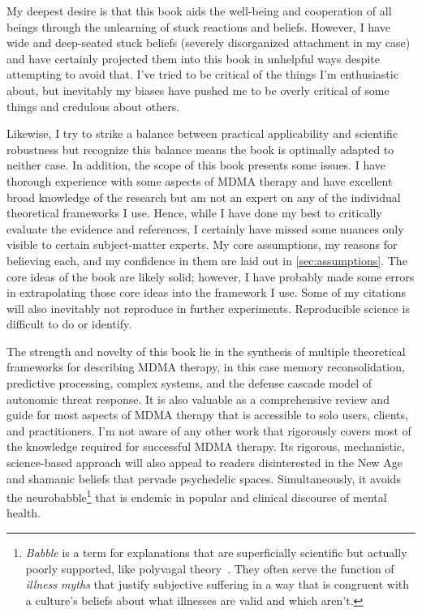 \documentclass[11pt,oneside]{book}
\let\cite\parencite
\begin{document}
My deepest desire is that this book aids the well-being and cooperation of all beings through the unlearning of stuck reactions and beliefs. However, I have wide and deep-seated stuck beliefs (severely disorganized attachment in my case) and have certainly projected them into this book in unhelpful ways despite attempting to avoid that. I've tried to be critical of the things I'm enthusiastic about, but inevitably my biases have pushed me to be overly critical of some things and credulous about others.

Likewise, I try to strike a balance between practical applicability and scientific robustness but recognize this balance means the book is optimally adapted to neither case. In addition, the scope of this book presents some issues. I have thorough experience with some aspects of MDMA therapy and have excellent broad knowledge of the research but am not an expert on any of the individual theoretical frameworks I use. Hence, while I have done my best to critically evaluate the evidence and references, I certainly have missed some nuances only visible to certain subject-matter experts. My core assumptions, my reasons for believing each, and my confidence in them are laid out in \cref{sec:assumptions}. The core ideas of the book are likely solid; however, I have probably made some errors in extrapolating those core ideas into the framework I use. Some of my citations will also inevitably not reproduce in further experiments. Reproducible science is difficult to do or identify.

The strength and novelty of this book lie in the synthesis of multiple theoretical frameworks for describing MDMA therapy, in this case memory reconsolidation, predictive processing, complex systems, and the defense cascade model of autonomic threat response. It is also valuable as a comprehensive review and guide for most aspects of MDMA therapy that is accessible to solo users, clients, and practitioners. I'm not aware of any other work that rigorously covers most of the knowledge required for successful MDMA therapy. Its rigorous, mechanistic, science-based approach will also appeal to readers disinterested in the New Age and shamanic beliefs that pervade psychedelic spaces. Simultaneously, it avoids the neurobabble\footnote{\textit{Babble} is a term for explanations that are superficially scientific but actually poorly supported, like polyvagal theory~\cite{luckPolyvagal}. They often serve the function of \textit{illness myths} that justify subjective suffering in a way that is congruent with a culture's beliefs about what illnesses are valid and which aren't.} that is endemic in popular and clinical discourse of mental health.
\end{document}
